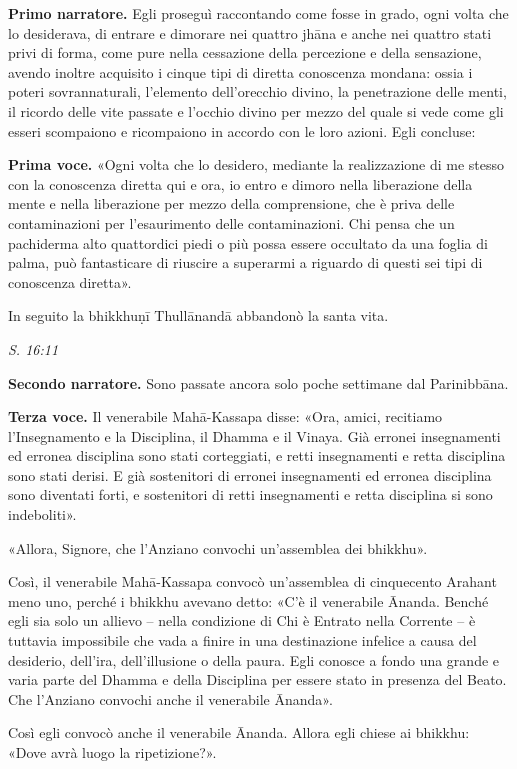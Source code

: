 \textbf{Primo narratore.} Egli proseguì raccontando come fosse in grado, ogni
volta che lo desiderava, di entrare e dimorare nei quattro jhāna e anche
nei quattro stati privi di forma, come pure nella cessazione della
percezione e della sensazione, avendo inoltre acquisito i cinque tipi di
diretta conoscenza mondana: ossia i poteri sovrannaturali, l’elemento
dell’orecchio divino, la penetrazione delle menti, il ricordo delle vite
passate e l’occhio divino per mezzo del quale si vede come gli esseri
scompaiono e ricompaiono in accordo con le loro azioni. Egli concluse:


\textbf{Prima voce.} «Ogni volta che lo desidero, mediante la realizzazione di me
stesso con la conoscenza diretta qui e ora, io entro e dimoro nella
liberazione della mente e nella liberazione per mezzo della
comprensione, che è priva delle contaminazioni per l’esaurimento delle
contaminazioni. Chi pensa che un pachiderma alto quattordici piedi o più
possa essere occultato da una foglia di palma, può fantasticare di
riuscire a superarmi a riguardo di questi sei tipi di conoscenza
diretta».


In seguito la bhikkhuṇī Thullānandā abbandonò la santa vita.


\emph{S. 16:11}


\textbf{Secondo narratore.} Sono passate ancora solo poche settimane dal
Parinibbāna.


\textbf{Terza voce.} Il venerabile Mahā-Kassapa disse: «Ora, amici, recitiamo
l’Insegnamento e la Disciplina, il Dhamma e il Vinaya. Già erronei
insegnamenti ed erronea disciplina sono stati corteggiati, e retti
insegnamenti e retta disciplina sono stati derisi. E già sostenitori di
erronei insegnamenti ed erronea disciplina sono diventati forti, e
sostenitori di retti insegnamenti e retta disciplina si sono
indeboliti».


«Allora, Signore, che l’Anziano convochi un’assemblea dei bhikkhu».


Così, il venerabile Mahā-Kassapa convocò un’assemblea di cinquecento
Arahant meno uno, perché i bhikkhu avevano detto: «C’è il venerabile
Ānanda. Benché egli sia solo un allievo – nella condizione di Chi è
Entrato nella Corrente – è tuttavia impossibile che vada a finire in una
destinazione infelice a causa del desiderio, dell’ira, dell’illusione o
della paura. Egli conosce a fondo una grande e varia parte del Dhamma e
della Disciplina per essere stato in presenza del Beato. Che l’Anziano
convochi anche il venerabile Ānanda».


Così egli convocò anche il venerabile Ānanda. Allora egli chiese ai
bhikkhu: «Dove avrà luogo la ripetizione?».


